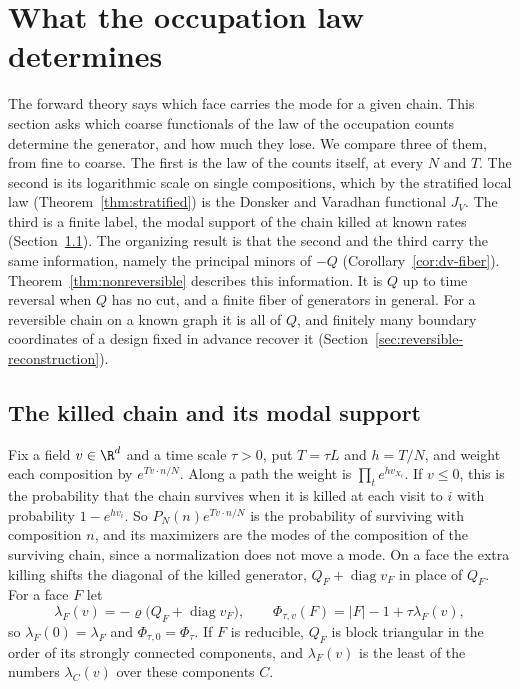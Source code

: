 \section{What the occupation law determines}\label{sec:reconstruction}

The forward theory says which face carries the mode for a given chain. This
section asks which coarse functionals of the law of the occupation counts
determine the generator, and how much they lose. We compare three of them, from
fine to coarse. The first is the law of the counts itself, at every $N$ and $T$.
The second is its logarithmic scale on single compositions, which by the
stratified local law (Theorem~\ref{thm:stratified}) is the Donsker and Varadhan
functional $J_V$. The third is a finite label, the modal support of the chain
killed at known rates (Section~\ref{sec:observation}). The organizing result is
that the second and the third carry the same information, namely the principal
minors of $-Q$ (Corollary~\ref{cor:dv-fiber}). Theorem~\ref{thm:nonreversible}
describes this information. It is $Q$ up to time reversal when $Q$ has no cut,
and a finite fiber of generators in general. For a reversible chain on a known
graph it is all of $Q$, and finitely many boundary coordinates of a design fixed
in advance recover it (Section~\ref{sec:reversible-reconstruction}).

\subsection{The killed chain and its modal support}\label{sec:observation}

Fix a field $v\in\R^d$ and a time scale $\tau>0$, put $T=\tau L$ and $h=T/N$,
and weight each composition by $e^{Tv\cdot n/N}$. Along a path the weight is
$\prod_te^{hv_{X_t}}$. If $v\le0$, this is the probability that the chain
survives when it is killed at each visit to $i$ with probability
$1-e^{hv_i}$. So $P_N(n)e^{Tv\cdot n/N}$ is the probability of surviving with
composition $n$, and its maximizers are the modes of the composition of the
surviving chain, since a normalization does not move a mode. On a face the extra
killing shifts the diagonal of the killed generator, $Q_F+\operatorname{diag}v_F$
in place of $Q_F$. For a face $F$ let
\[
 \lambda_F(v)=-\varrho\bigl(Q_F+\operatorname{diag}v_F\bigr),\qquad
 \Phi_{\tau,v}(F)=|F|-1+\tau\lambda_F(v),
\]
so $\lambda_F(0)=\lambda_F$ and $\Phi_{\tau,0}=\Phi_\tau$. If $F$ is reducible,
$Q_F$ is block triangular in the order of its strongly connected components, and
$\lambda_F(v)$ is the least of the numbers $\lambda_C(v)$ over these components $C$.

